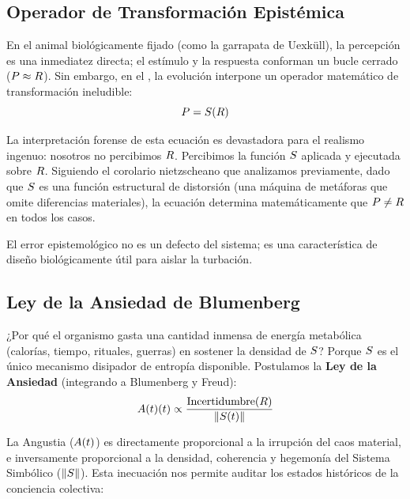 \subsection{Operador de Transformación Epistémica}

En el animal biológicamente fijado (como la garrapata de Uexküll), la percepción es una inmediatez directa; el estímulo y la respuesta conforman un bucle cerrado ($P \approx R$). Sin embargo, en el \AnimalSimbolico, la evolución interpone un operador matemático de transformación ineludible:
\begin{equation}
    P = S(R)
\end{equation}

La interpretación forense de esta ecuación es devastadora para el realismo ingenuo: nosotros no percibimos $R$. Percibimos la función $S$ aplicada y ejecutada sobre $R$. Siguiendo el corolario nietzscheano que analizamos previamente, dado que $S$ es una función estructural de distorsión (una máquina de metáforas que omite diferencias materiales), la ecuación determina matemáticamente que $P \neq R$ en todos los casos. 

El error epistemológico no es un defecto del sistema; es una característica de diseño biológicamente útil para aislar la turbación.

\subsection{Ley de la Ansiedad de Blumenberg}

¿Por qué el organismo gasta una cantidad inmensa de energía metabólica (calorías, tiempo, rituales, guerras) en sostener la densidad de $S$? Porque $S$ es el único mecanismo disipador de entropía disponible. Postulamos la \textbf{Ley de la Ansiedad} (integrando a Blumenberg y Freud):
\begin{equation}
    A(t)(t) \propto \frac{\text{Incertidumbre}(R)}{\|S(t)\|}
\end{equation}

La Angustia ($A(t)$) es directamente proporcional a la irrupción del caos material, e inversamente proporcional a la densidad, coherencia y hegemonía del Sistema Simbólico ($\|S\|$). Esta inecuación nos permite auditar los estados históricos de la conciencia colectiva:

